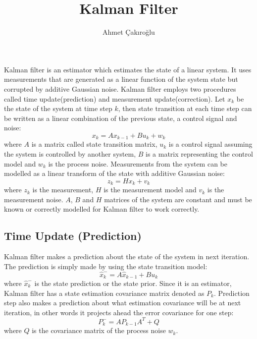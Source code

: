 \documentclass{article}
\title{Kalman Filter}
\author{Ahmet Çakıroğlu}
\date{}
\begin{document}
\maketitle


Kalman filter is an estimator which estimates the state of a linear system. It uses measurements that are generated as a linear function of the system state but corrupted by additive Gaussian noise. Kalman filter employs two procedures called time update(prediction) and measurement update(correction). Let $x_k$ be the state of the system at time step $k$, then state transition at each time step can be written as a linear combination of the previous state, a control signal and noise:
\begin{equation}
x_k = Ax_{k-1}+Bu_k+w_{k}
\end{equation}
where $A$ is a matrix called state transition matrix, $u_k$ is a control signal assuming the system is controlled by another system, $B$ is a matrix representing the control model and $w_k$ is the process noise. Measurements from the system can be modelled as a linear transform of the state with additive Gaussian noise:
\begin{equation}
z_k = Hx_k+v_k
\end{equation}
where $z_k$ is the measurement, $H$ is the measurement model and $v_k$ is the measurement noise. $A$, $B$ and $H$ matrices of the system are constant and must be known or correctly modelled for Kalman filter to work correctly.
\subsection*{Time Update (Prediction)}
Kalman filter makes a prediction about the state of the system in next iteration. The prediction is simply made by using the state transition model:
\begin{equation}
\hat{x}_{k}^{-} = A\hat{x}_{k-1}+Bu_{k}
\end{equation}
where $\hat{x}_{k}^{-}$ is the state prediction or the state prior. Since it is an estimator, Kalman filter has a state estimation covariance matrix denoted as $P_k$. Prediction step also makes a prediction about what estimation covariance will be at next iteration, in other words it projects ahead the error covariance for one step:
\begin{equation}
P_{k}^{-} = AP_{k-1}A^{T}+Q
\end{equation}
where $Q$ is the covariance matrix of the process noise $w_k$.
\end{document}
